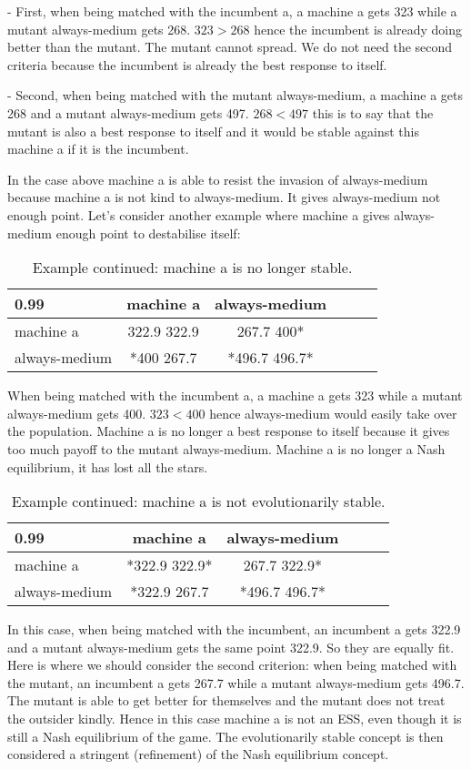 \documentclass[12.5pt]{report}
\begin{document}
- First, when being matched with the incumbent a, a machine a gets 323 while a mutant always-medium gets 268. $323 > 268$ hence the incumbent is already doing better than the mutant. The mutant cannot spread. We do not need the second criteria because the incumbent is already the best response to itself.

- Second, when being matched with the mutant always-medium, a machine a gets 268 and a mutant always-medium gets 497. $268 < 497$ this is to say that the mutant is also a best response to itself and it would be stable against this machine a if it is the incumbent.

In the case above machine a is able to resist the invasion of always-medium because machine a is not kind to always-medium. It gives always-medium not enough point. Let's consider another example where machine a gives always-medium enough point to destabilise itself:

\begin{table}[h!]
\center
\begin{tabular}{l|ccccc}
\textbf{0.99}& machine a & always-medium \\
\hline
machine a & 322.9 322.9 &   267.7 400*   \\
always-medium  &  *400 267.7  &    *496.7 496.7*  \\
\end{tabular}
\caption{Example continued: machine a is no longer stable.}
\end{table}

When being matched with the incumbent a, a machine a gets 323 while a mutant always-medium gets 400. $323 < 400$ hence always-medium would easily take over the population. Machine a is no longer a best response to itself because it gives too much payoff to the mutant always-medium. Machine a is no longer a Nash equilibrium, it has lost all the stars.

\begin{table}[h!]
\center
\begin{tabular}{l|ccccc}
\textbf{0.99}& machine a & always-medium \\
\hline
machine a & *322.9 322.9* &   267.7 322.9*   \\
always-medium  &  *322.9 267.7  &    *496.7 496.7*  \\
\end{tabular}
\caption{Example continued: machine a is not evolutionarily stable.}
\end{table}

In this case, when being matched with the incumbent, an incumbent a gets 322.9 and a mutant always-medium gets the same point 322.9. So they are equally fit. Here is where we should consider the second criterion: when being matched with the mutant, an incumbent a gets 267.7 while a mutant always-medium gets 496.7. The mutant is able to get better for themselves and the mutant does not treat the outsider kindly. Hence in this case machine a is not an ESS, even though it is still a Nash equilibrium of the game. The evolutionarily stable concept is then considered a stringent (refinement) of the Nash equilibrium concept.
\end{document}
